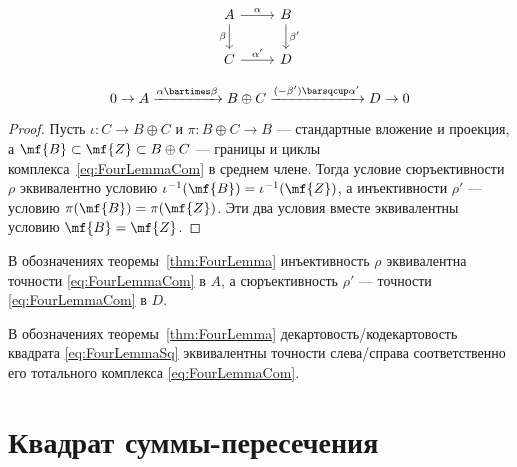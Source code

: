 \documentclass[
	extrafontsizes,
	11pt,
	hyphens,
]{memoir}
\begin{document}
\begin{theorem}
%
\begin{minipage}{0.33\linewidth}
    \begin{equation}
		\begin{tikzcd}[ampersand replacement=\&,]
		A \arrow{r}{\alpha} \arrow[swap]{d}{\beta}
			\& B \arrow{d}{\beta'} \\
		C \arrow{r}{\alpha'}
			\& D
		\end{tikzcd}
		\label{eq:FourLemmaSq}
    \end{equation}
\end{minipage}%
\begin{minipage}{0.66\linewidth}
    \begin{equation}
		0 \to A
		\xrightarrow{\alpha \bartimes \beta}
		B \oplus C
		\xrightarrow{(-\beta') \barsqcup \alpha'}
		D \to 0
		\label{eq:FourLemmaCom}
    \end{equation}
\end{minipage}
\end{theorem}

\begin{proof}
Пусть \(\iota : C \to B \oplus C\) и \(\pi : B \oplus C \to B\) --- стандартные вложение и проекция, а \(\mf{B} \subset \mf{Z} \subset B \oplus C\) --- границы и циклы комплекса~\eqref{eq:FourLemmaCom} в среднем члене.
Тогда условие сюръективности \(\rho\) эквивалентно условию \(\iota^{-1}(\mf{B}) = \iota^{-1}(\mf{Z})\), а инъективности \(\rho'\) --- условию \(\pi(\mf{B}) = \pi(\mf{Z})\).
Эти два условия вместе эквивалентны условию \(\mf{B} = \mf{Z}\).
\end{proof}

\begin{observation}
В обозначениях теоремы~\ref{thm:FourLemma} инъективность \(\rho\) эквивалентна точности \eqref{eq:FourLemmaCom} в \(A\), а сюръективность \(\rho'\) --- точности \eqref{eq:FourLemmaCom} в \(D\).
\end{observation}

\begin{observation}
В обозначениях теоремы~\ref{thm:FourLemma} де\-кар\-то\-вость/ко\-де\-кар\-то\-вость квадрата \eqref{eq:FourLemmaSq} эквивалентны точности слева/справа соответственно его тотального комплекса \eqref{eq:FourLemmaCom}.
\end{observation}


\section{Квадрат суммы-пересечения}
\end{document}

